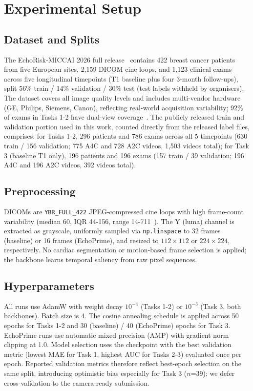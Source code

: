\documentclass[runningheads]{llncs}
\begin{document}
\section{Experimental Setup}

\subsection{Dataset and Splits}

The EchoRisk-MICCAI 2026 full release~\cite{ref_echorisk} contains 422 breast cancer patients from five European sites, 2,159 DICOM cine loops, and 1,123 clinical exams across five longitudinal timepoints (T1 baseline plus four 3-month follow-ups), split 56\% train / 14\% validation / 30\% test (test labels withheld by organisers). The dataset covers all image quality levels and includes multi-vendor hardware (GE, Philips, Siemens, Canon), reflecting real-world acquisition variability; 92\% of exams in Tasks 1-2 have dual-view coverage~\cite{ref_echorisk}. The publicly released train and validation portion used in this work, counted directly from the released label files, comprises: for Tasks 1-2, 296 patients and 786 exams across all 5 timepoints (630 train / 156 validation; 775 A4C and 728 A2C videos, 1,503 videos total); for Task 3 (baseline T1 only), 196 patients and 196 exams (157 train / 39 validation; 196 A4C and 196 A2C videos, 392 videos total).

\subsection{Preprocessing}

DICOMs are \texttt{YBR\_FULL\_422} JPEG-compressed cine loops with high frame-count variability (median 60, IQR 44-156, range 14-711~\cite{ref_echorisk}). The Y (luma) channel is extracted as grayscale, uniformly sampled via \texttt{np.linspace} to 32 frames (baseline) or 16 frames (EchoPrime), and resized to $112{\times}112$ or $224{\times}224$, respectively. No cardiac segmentation or motion-based frame selection is applied; the backbone learns temporal saliency from raw pixel sequences.

\subsection{Hyperparameters}

All runs use AdamW with weight decay $10^{-4}$ (Tasks 1-2) or $10^{-3}$ (Task 3, both backbones). Batch size is 4. The cosine annealing schedule is applied across 50 epochs for Tasks 1-2 and 30 (baseline) / 40 (EchoPrime) epochs for Task 3. EchoPrime runs use automatic mixed precision (AMP) with gradient norm clipping at 1.0. Model selection uses the checkpoint with the best validation metric (lowest MAE for Task 1, highest AUC for Tasks 2-3) evaluated once per epoch. Reported validation metrics therefore reflect best-epoch selection on the same split, introducing optimistic bias especially for Task 3 ($n$=39); we defer cross-validation to the camera-ready submission.
\end{document}
